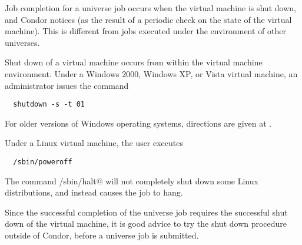 Job completion for a  universe job occurs when 
the virtual machine is shut down, and Condor notices 
(as the result of a periodic check on the state of the virtual machine).
This is different from jobs executed under the environment of other 
universes.

Shut down of a virtual machine occurs from within the virtual
machine environment.
Under a Windows 2000, Windows XP, or Vista virtual machine,
an administrator issues the command
\begin{verbatim}
  shutdown -s -t 01
\end{verbatim}
For older versions of Windows operating systems, 
directions are given at
.

Under a Linux virtual machine,
the  user executes
\begin{verbatim}
  /sbin/poweroff
\end{verbatim}
The command \verb@/sbin/halt@ will not completely
shut down some Linux distributions, and instead
causes the job to hang.

Since the successful completion of the  universe job
requires the successful shut down of the virtual machine,
it is good advice to try the shut down procedure outside of
Condor, before a  universe job is submitted.


